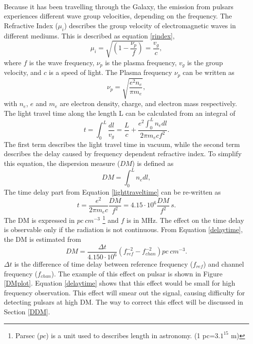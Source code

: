 \documentclass[thesis_msc.tex]{subfiles}
\begin{document}
\paragraph{} Because it has been travelling through the Galaxy, the emission from pulsars experiences different wave group velocities, depending on the frequency. The Refractive Index ($\mu_i$) describes the group velocity of electromagnetic waves in different mediums. This is described as equation \ref{rindex}, 
\begin{equation}\label{rindex}
\mu_i=\sqrt{(1-\dfrac{\nu_p}{f})}=\dfrac{v_g}{c},
\end{equation} 
where $f$ is the wave frequency, $\nu_p$ is the plasma frequency, $v_g$ is the group velocity, and $c$ is a speed of light. The Plasma frequency $\nu_p$ can be written as %
 \begin{equation}\label{fp}
 \nu_p=\sqrt{\dfrac{e^2n_e}{\pi m_e}},
  \end{equation} 
with $n_e$, $e$ and $m_e$ are electron density, charge, and electron mass respectively. The light travel time along the length L can be calculated from an integral of  
\begin{equation}\label{lighttraveltime}
 t=\int_{0}^{L}\dfrac{dl}{v_g}=\dfrac{L}{c}+\dfrac{e^2 \int_{0}^{L} n_e dl}{2\pi m_e c f^2}.
\end{equation} 
The first term describes the light travel time in vacuum, while the second term describes the delay caused by frequency dependent refractive index. To simplify this equation, the dispersion measure ($DM$) is defined as  
\begin{equation}
\label{DMdef}
DM=\int_{0}^{L} n_e dl,
\end{equation}
The time delay part from Equation \ref{lighttraveltime} can be re-written as    
\begin{equation}
\label{delaytime}
t=\dfrac{e^2}{2 \pi m_e c }\dfrac{DM}{f^2}=4.15\cdot 10^6 \dfrac{DM}{f^2}\,s.
\end{equation}
The DM is expressed in $pc~cm^{-3}$ \footnote{Parsec ($pc$) is a unit used to describes length in astronomy. (1 pc=$3.1^{15}$ m)  } and $f$ is in MHz. The effect on the time delay is observable only if the radiation is not continuous. From Equation \ref{delaytime}, the DM is estimated from 
\begin{equation}
\label{DMcal}
DM=\dfrac{\Delta t}{4.150\cdot 10^6}(f_{ref}^{-2}-f_{chan}^{-2}) pc ~ cm^{-3}.
\end{equation}
  $\Delta t$ is the difference of time delay between reference frequency ($f_{ref}$) and channel frequency ($f_{chan}$). The example of this effect on pulsar is shown in Figure \ref{DMplot}. Equation \ref{delaytime} shows that this effect would be small for high frequency observation. This effect will smear out the signal, causing difficulty for detecting pulsars at high DM. The way to correct this effect will be discussed in Section \ref{DDM}.    
\end{document}
